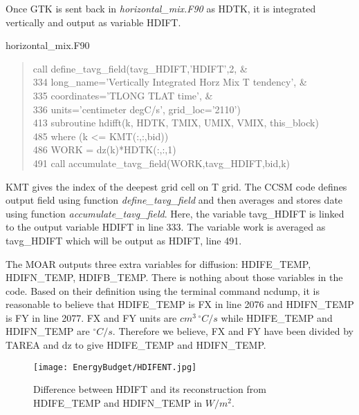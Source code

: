 \begin{appendices}
Once GTK is sent back in \textit{horizontal\_mix.F90} as HDTK, it is integrated vertically and output as variable HDIFT. 
\begin{center} horizontal\_mix.F90 \end{center}
\begin{quotation}
\small
\linespread{0.5}\selectfont{} \hspace{1em} call define\_tavg\_field(tavg\_HDIFT,'HDIFT',2,   \&\\
334 \hspace{1em} long\_name='Vertically Integrated Horz Mix T tendency', \&\\
335 \hspace{1em} coordinates='TLONG TLAT time',   \&\\
336 \hspace{1em} units='centimeter degC/s', grid\_loc='2110')\\
413 \hspace{1em} subroutine hdifft(k, HDTK, TMIX, UMIX, VMIX, this\_block)\\
485 \hspace{1em} where (k <= KMT(:,:,bid))\\
486 \hspace{1em} WORK = dz(k)*HDTK(:,:,1)\\
491 \hspace{1em} call accumulate\_tavg\_field(WORK,tavg\_HDIFT,bid,k)
\end{quotation}
KMT gives the index of the deepest grid cell on T grid. The CCSM code defines output field using function \textit{define\_tavg\_field} and then averages and stores date using function \textit{accumulate\_tavg\_field}. Here, the variable tavg\_HDIFT is linked to the output variable HDIFT in line 333. The variable work is averaged as tavg\_HDIFT which will be output as HDIFT, line 491. 

The MOAR outputs three extra variables for diffusion: HDIFE\_TEMP, HDIFN\_TEMP, HDIFB\_TEMP. There is nothing about those variables in the code. Based on their definition using the terminal command ncdump, it is reasonable to believe that HDIFE\_TEMP is FX in line 2076 and HDIFN\_TEMP is FY in line 2077. FX and FY units are $cm^3\,^\circ C/s$ while HDIFE\_TEMP and HDIFN\_TEMP are $^\circ C/s$. Therefore we believe, FX and FY have been divided by TAREA and dz to give HDIFE\_TEMP and HDIFN\_TEMP. 

\begin{figure}[t]
\center
\texttt{[image: EnergyBudget/HDIFENT.jpg]}
\caption{Difference between HDIFT and its reconstruction from HDIFE\_TEMP and HDIFN\_TEMP in $W/m^2$.}
\label{hdifent}
\end{figure}


\end{appendices}
